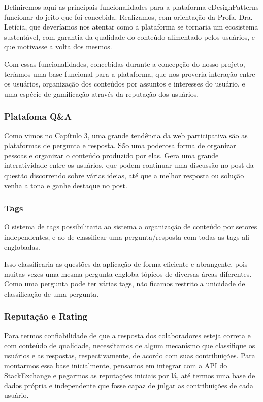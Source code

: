 Definiremos aqui as principais funcionalidades para a plataforma eDesignPatterns funcionar do jeito que foi concebida. Realizamos, com orientação da Profa. Dra. Letícia, que deveríamos nos atentar como a plataforma se tornaria um ecosistema sustentável, com garantia da qualidade do conteúdo alimentado pelos usuários, e que motivasse a volta dos mesmos.

Com essas funcionalidades, concebidas durante a concepção do nosso projeto, teríamos uma base funcional para a plataforma, que nos proveria interação entre os usuários, organização dos conteúdos por assuntos e interesses do usuário, e uma espécie de gamificação através da reputação dos usuários.

\subsubsection{Platafoma Q\&A}
Como vimos no Capítulo 3, uma grande tendência da web participativa são as  plataformas de pergunta e resposta. São uma poderosa forma de organizar pessoas e organizar o conteúdo produzido por elas. Gera uma grande interatividade entre os usuários, que podem continuar uma discussão no post da questão discorrendo sobre várias ideias, até que a melhor resposta ou solução venha a tona e ganhe destaque no post.
\subsubsection{Tags}
O sistema de tags possibilitaria ao sistema a organização de conteúdo por setores independentes, e ao de classificar uma pergunta/resposta com todas as tags ali englobadas.

Isso classificaria as questões da aplicação de forma eficiente e abrangente, pois muitas vezes uma mesma pergunta engloba tópicos de diversas áreas diferentes. Como uma pergunta pode ter várias tags, não ficamos restrito a unicidade de classificação de uma pergunta.
\subsubsection{Reputação e Rating}
Para termos confiabilidade de que a resposta dos colaboradores esteja correta e com conteúdo de qualidade, necessitamos de algum mecanismo que classifique os usuários e as respostas, respectivamente, de acordo com suas contribuições. Para montarmos essa base inicialmente, pensamos em integrar com a API do StackExchange \cite{stack} e pegarmos as reputações iniciais por lá, até termos uma base de dados própria e independente que fosse capaz de julgar as contribuições de cada usuário.

